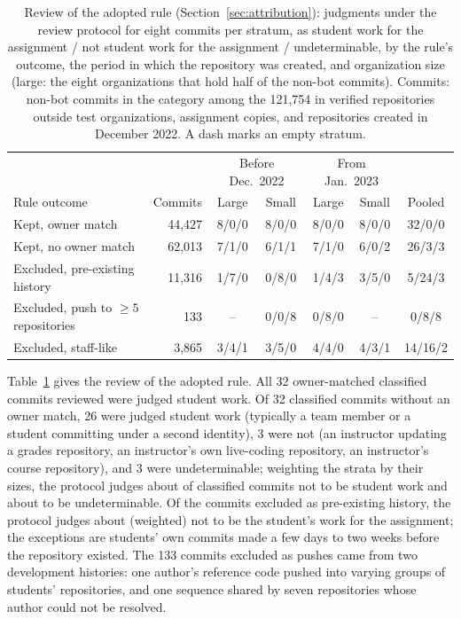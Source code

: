\documentclass[acmsmall,screen,review,anonymous]{acmart}
\begin{document}
\begin{table}
\caption{Review of the adopted rule (Section~\ref{sec:attribution}): judgments under the review protocol for eight commits per stratum, as student work for the assignment / not student work for the assignment / undeterminable, by the rule's outcome, the period in which the repository was created, and organization size (large: the eight organizations that hold half of the non-bot commits). Commits: non-bot commits in the category among the 121,754 in verified repositories outside test organizations, assignment copies, and repositories created in December 2022. A dash marks an empty stratum.}
\label{tab:review}
\footnotesize
\setlength{\tabcolsep}{4pt}
\begin{tabular}{@{}l r c c c c c@{}}
\toprule
 & & \multicolumn{2}{c}{Before Dec.\ 2022} & \multicolumn{2}{c}{From Jan.\ 2023} & \\
Rule outcome & Commits & Large & Small & Large & Small & Pooled \\
\midrule
Kept, owner match & 44,427 & 8/0/0 & 8/0/0 & 8/0/0 & 8/0/0 & 32/0/0 \\
Kept, no owner match & 62,013 & 7/1/0 & 6/1/1 & 7/1/0 & 6/0/2 & 26/3/3 \\
Excluded, pre-existing history & 11,316 & 1/7/0 & 0/8/0 & 1/4/3 & 3/5/0 & 5/24/3 \\
Excluded, push to $\geq 5$ repositories & 133 & -- & 0/0/8 & 0/8/0 & -- & 0/8/8 \\
Excluded, staff-like & 3,865 & 3/4/1 & 3/5/0 & 4/4/0 & 4/3/1 & 14/16/2 \\
\bottomrule
\end{tabular}
\end{table}

Table~\ref{tab:review} gives the review of the adopted rule. All 32 owner-matched classified commits reviewed were judged student work. Of 32 classified commits without an owner match, 26 were judged student work (typically a team member or a student committing under a second identity), 3 were not (an instructor updating a grades repository, an instructor's own live-coding repository, an instructor's course repository), and 3 were undeterminable; weighting the strata by their sizes, the protocol judges about  of classified commits not to be student work and about  to be undeterminable. Of the commits excluded as pre-existing history, the protocol judges about  (weighted) not to be the student's work for the assignment; the exceptions are students' own commits made a few days to two weeks before the repository existed. The 133 commits excluded as pushes came from two development histories: one author's reference code pushed into varying groups of students' repositories, and one sequence shared by seven repositories whose author could not be resolved.
\end{document}
